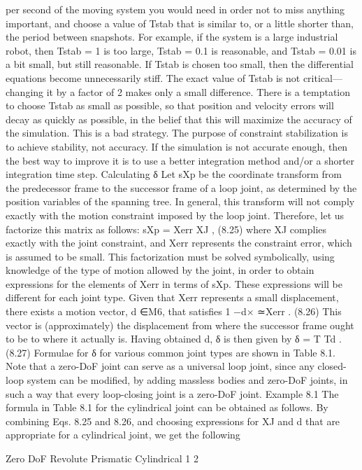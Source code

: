 per second of the moving system you would need in order not to miss anything important, and choose a value of Tstab that is similar to, or a little shorter than, the period between snapshots. For example, if the system is a large industrial robot, then Tstab = 1 is too large, Tstab = 0.1 is reasonable, and Tstab = 0.01 is a bit small, but still reasonable. If Tstab is chosen too small, then the differential equations become unnecessarily stiff. The exact value of Tstab is not critical— changing it by a factor of 2 makes only a small difference. There is a temptation to choose Tstab as small as possible, so that position and velocity errors will decay as quickly as possible, in the belief that this will maximize the accuracy of the simulation. This is a bad strategy. The purpose of constraint stabilization is to achieve stability, not accuracy. If the simulation is not accurate enough, then the best way to improve it is to use a better integration method and/or a shorter integration time step. Calculating δ Let sXp be the coordinate transform from the predecessor frame to the successor frame of a loop joint, as determined by the position variables of the spanning tree. In general, this transform will not comply exactly with the motion constraint imposed by the loop joint. Therefore, let us factorize this matrix as follows: sXp = Xerr XJ , (8.25) where XJ complies exactly with the joint constraint, and Xerr represents the constraint error, which is assumed to be small. This factorization must be solved symbolically, using knowledge of the type of motion allowed by the joint, in order to obtain expressions for the elements of Xerr in terms of sXp. These expressions will be different for each joint type. Given that Xerr represents a small displacement, there exists a motion vector, d ∈M6, that satisfies 1 −d× ≃Xerr . (8.26) This vector is (approximately) the displacement from where the successor frame ought to be to where it actually is. Having obtained d, δ is then given by δ = T Td . (8.27) Formulae for δ for various common joint types are shown in Table 8.1. Note that a zero-DoF joint can serve as a universal loop joint, since any closed-loop system can be modified, by adding massless bodies and zero-DoF joints, in such a way that every loop-closing joint is a zero-DoF joint. Example 8.1 The formula in Table 8.1 for the cylindrical joint can be obtained as follows. By combining Eqs. 8.25 and 8.26, and choosing expressions for XJ and d that are appropriate for a cylindrical joint, we get the following

Zero DoF Revolute Prismatic Cylindrical 1 2

